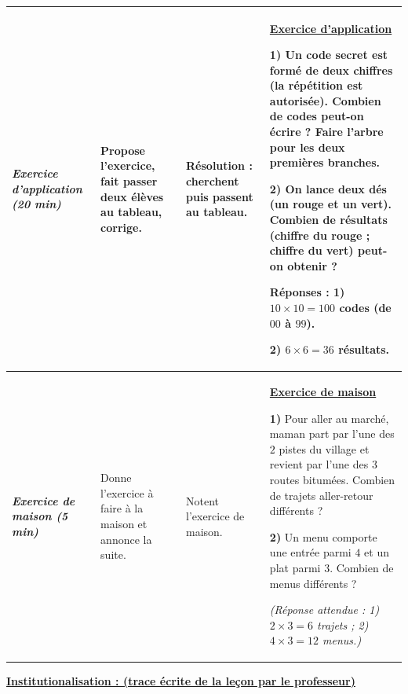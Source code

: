 \documentclass[10pt]{article}
\newcommand{\titreR}[1]{\underline{\textcolor{rougetitre}{\bfseries #1}}}
\newcommand{\app}{\titreR{Exercice d'application}}
\newcommand{\maison}{\underline{\textcolor{rougemaison}{\bfseries Exercice de maison}}}
\newcommand{\moment}[1]{\textbf{\itshape #1}}
\begin{document}
\begin{longtable}{|p{2.35cm}|p{5.35cm}|p{4.55cm}|p{13.85cm}|}
\moment{Exercice d'application (20 min)} &
Propose l'exercice, fait passer deux élèves au tableau, corrige. &
\textbf{Résolution} : cherchent puis passent au tableau. &
\app \par
\textbf{1)} Un code secret est formé de deux chiffres (la répétition est autorisée).
Combien de codes peut-on écrire ? Faire l'arbre pour les deux premières branches. \par
\textbf{2)} On lance deux dés (un rouge et un vert). Combien de résultats
(chiffre du rouge ; chiffre du vert) peut-on obtenir ? \par
\textbf{Réponses :} \textbf{1)} $10\times10=100$ codes (de $00$ à $99$). \par
\textbf{2)} $6\times6=36$ résultats. \\ \hline

\moment{Exercice de maison (5 min)} &
Donne l'exercice à faire à la maison et annonce la suite. &
Notent l'exercice de maison. &
\maison \par
\textbf{1)} Pour aller au marché, maman part par l'une des $2$ pistes du village et
revient par l'une des $3$ routes bitumées. Combien de trajets aller-retour différents ? \par
\textbf{2)} Un menu comporte une entrée parmi $4$ et un plat parmi $3$. Combien de
menus différents ? \par
\textit{(Réponse attendue : 1) $2\times3=6$ trajets ; 2) $4\times3=12$ menus.)} \\ \hline
\end{longtable}

\begin{center}
\underline{\textcolor{rougetitre}{\large\bfseries Institutionalisation \; : \; (trace écrite de la leçon par le professeur)}}
\end{center}
\end{document}
